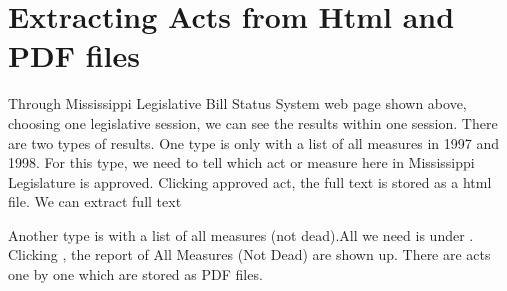 \documentclass[letterpaper,10pt,english]{jupyterBook}
\begin{document}
\section{Extracting Acts from Html and PDF files}
\label{\detokenize{ch27:extracting-acts-from-html-and-pdf-files}}
\sphinxAtStartPar
Through Mississippi Legislative Bill Status System web page shown above, choosing one legislative session, we can see the results within one session. There are two types of results. One type is only with a list of all measures in 1997 and 1998. For this type, we need to tell which act or measure here in Mississippi Legislature is approved. Clicking approved act, the full text is stored as a html file. We can extract full text

\sphinxAtStartPar
Another type is with a list of all measures (not dead).All we need is under .  Clicking , the report of All Measures (Not Dead) are shown up. There are acts one by one which are stored as PDF files.
\end{document}
